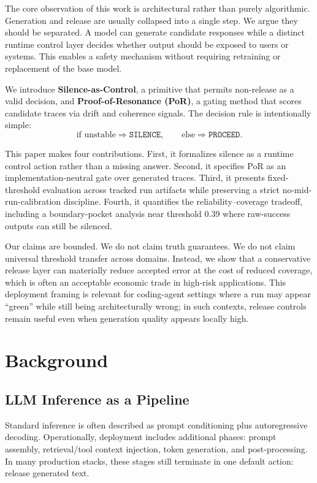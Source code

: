 \documentclass[11pt]{article}
\begin{document}
The core observation of this work is architectural rather than purely algorithmic. Generation and release are usually collapsed into a single step. We argue they should be separated. A model can generate candidate responses while a distinct runtime control layer decides whether output should be exposed to users or systems. This enables a safety mechanism without requiring retraining or replacement of the base model.

We introduce \textbf{Silence-as-Control}, a primitive that permits non-release as a valid decision, and \textbf{Proof-of-Resonance (PoR)}, a gating method that scores candidate traces via drift and coherence signals. The decision rule is intentionally simple:
\begin{equation}
\text{if unstable} \Rightarrow \texttt{SILENCE}, \qquad \text{else} \Rightarrow \texttt{PROCEED}.
\end{equation}

This paper makes four contributions. First, it formalizes silence as a runtime control action rather than a missing answer. Second, it specifies PoR as an implementation-neutral gate over generated traces. Third, it presents fixed-threshold evaluation across tracked run artifacts while preserving a strict no-mid-run-calibration discipline. Fourth, it quantifies the reliability--coverage tradeoff, including a boundary-pocket analysis near threshold 0.39 where raw-success outputs can still be silenced.

Our claims are bounded. We do not claim truth guarantees. We do not claim universal threshold transfer across domains. Instead, we show that a conservative release layer can materially reduce accepted error at the cost of reduced coverage, which is often an acceptable economic trade in high-risk applications. This deployment framing is relevant for coding-agent settings where a run may appear ``green'' while still being architecturally wrong; in such contexts, release controls remain useful even when generation quality appears locally high.

\section{Background}
\subsection{LLM Inference as a Pipeline}
Standard inference is often described as prompt conditioning plus autoregressive decoding. Operationally, deployment includes additional phases: prompt assembly, retrieval/tool context injection, token generation, and post-processing. In many production stacks, these stages still terminate in one default action: release generated text.
\end{document}
